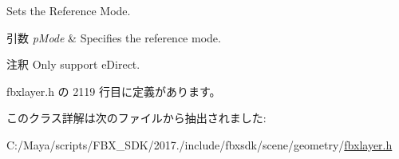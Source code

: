 Sets the Reference Mode. 
\begin{DoxyParams}{引数}
{\em p\+Mode} & Specifies the reference mode. \\
\hline
\end{DoxyParams}
\begin{DoxyRemark}{注釈}
Only support e\+Direct. 
\end{DoxyRemark}


 fbxlayer.\+h の 2119 行目に定義があります。



このクラス詳解は次のファイルから抽出されました\+:\begin{DoxyCompactItemize}
\item 
C\+:/\+Maya/scripts/\+F\+B\+X\+\_\+\+S\+D\+K/2017./include/fbxsdk/scene/geometry/\hyperlink{fbxlayer_8h}{fbxlayer.\+h}\end{DoxyCompactItemize}
